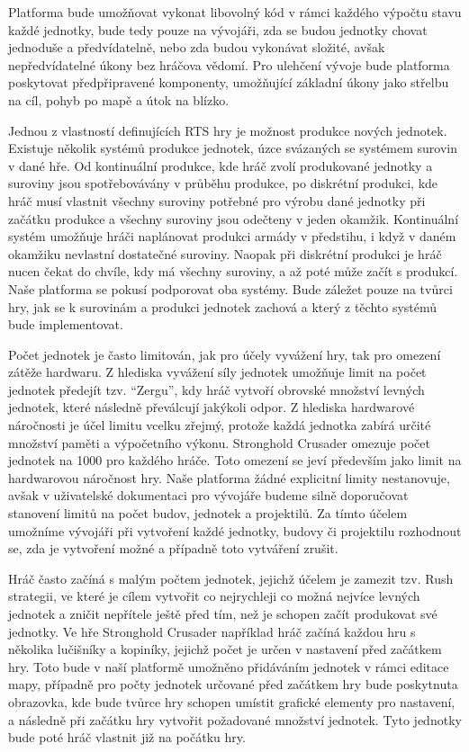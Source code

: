 Platforma bude umožňovat vykonat libovolný kód v rámci každého výpočtu stavu každé jednotky, bude tedy pouze na vývojáři, zda se budou jednotky chovat jednoduše a předvídatelně, nebo zda budou vykonávat složité, avšak nepředvídatelné úkony bez hráčova vědomí. Pro ulehčení vývoje bude platforma poskytovat předpřipravené komponenty, umožňující základní úkony jako střelbu na cíl, pohyb po mapě a útok na blízko.

Jednou z vlastností definujících RTS hry je možnost produkce nových jednotek. Existuje několik systémů produkce jednotek, úzce svázaných se systémem surovin v dané hře.  Od kontinuální produkce, kde hráč zvolí produkované jednotky a suroviny jsou spotřebovávány v průběhu produkce, po diskrétní produkci, kde hráč musí vlastnit všechny suroviny potřebné pro výrobu dané jednotky při začátku produkce a všechny suroviny jsou odečteny v jeden okamžik. Kontinuální systém umožňuje hráči naplánovat produkci armády v předstihu, i když v daném okamžiku nevlastní dostatečné suroviny. Naopak při diskrétní produkci je hráč nucen čekat do chvíle, kdy má všechny suroviny, a až poté může začít s produkcí. Naše platforma se pokusí podporovat oba systémy. Bude záležet pouze na tvůrci hry, jak se k surovinám a produkci jednotek zachová a který z těchto systémů bude implementovat.

Počet jednotek je často limitován, jak pro účely vyvážení hry, tak pro omezení zátěže hardwaru. Z hlediska vyvážení síly jednotek umožňuje limit na počet jednotek předejít tzv. ``Zergu'', kdy hráč vytvoří obrovské množství levných jednotek, které následně převálcují jakýkoli odpor. Z hlediska hardwarové náročnosti je účel limitu vcelku zřejmý, protože každá jednotka zabírá určité množství paměti a výpočetního výkonu. Stronghold Crusader omezuje počet jednotek na 1000 pro každého hráče. Toto omezení se jeví především jako limit na hardwarovou náročnost hry. Naše platforma žádné explicitní limity nestanovuje, avšak v uživatelské dokumentaci pro vývojáře budeme silně doporučovat stanovení limitů na počet budov, jednotek a projektilů. Za tímto účelem umožníme vývojáři při vytvoření každé jednotky, budovy či projektilu rozhodnout se, zda je vytvoření možné a případně toto vytváření zrušit. 

Hráč často začíná s malým počtem jednotek, jejichž účelem je zamezit tzv. Rush strategii, ve které je cílem vytvořit co nejrychleji co možná nejvíce levných jednotek a zničit nepřítele ještě před tím, než je schopen začít produkovat své jednotky. Ve hře Stronghold Crusader například hráč začíná každou hru s několika lučišníky a kopiníky, jejichž počet je určen v nastavení před začátkem hry. Toto bude v naší platformě umožněno přidáváním jednotek v rámci editace mapy, případně pro počty jednotek určované před začátkem hry bude poskytnuta obrazovka, kde bude tvůrce hry schopen umístit grafické elementy pro nastavení, a následně při začátku hry vytvořit požadované množství jednotek. Tyto jednotky bude poté hráč vlastnit již na počátku hry.

